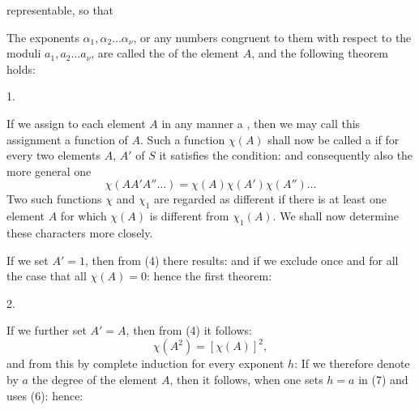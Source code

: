
representable, so that

The exponents $\alpha_1, \alpha_2 \ldots \alpha_\nu$, or any numbers congruent to them
with respect to the moduli $a_1, a_2 \ldots a_\nu$, are called the 
of the element $A$, and the following theorem holds:

1. 

If we assign to each element $A$ in any manner a ,
then we may call this assignment a function
of $A$. Such a function $\chi(A)$ shall now be called a
 if for every two elements
$A$, $A'$ of $S$ it satisfies the condition:
and consequently also the more general one
\[ \chi(AA'A''\ldots) = \chi(A)\chi(A')\chi(A'')\ldots \]
Two such functions $\chi$ and $\chi_1$ are regarded as different
if there is at least one element $A$ for which $\chi(A)$
is different from $\chi_1(A)$. We shall now determine these
characters more closely.

If we set $A' = 1$, then from (4) there results:
and if we exclude once and for all the case that all
$\chi(A) = 0$:
hence the first theorem:

2. 

If we further set $A' = A$, then from (4) it follows:
\[ \chi(A^2) = [\chi(A)]^2, \]
and from this by complete induction for every exponent $h$:
If we therefore denote by $a$ the degree of the element $A$, then
it follows, when one sets $h = a$ in (7) and uses (6):
hence:
